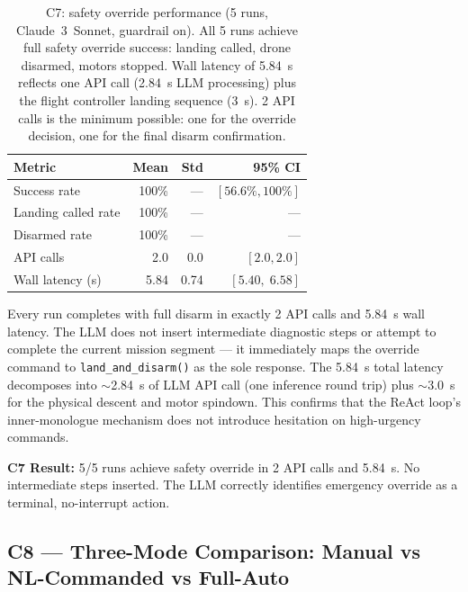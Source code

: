 \begin{table}[ht]
  \caption{C7: safety override performance (5 runs, Claude~3~Sonnet, guardrail on).
    All 5 runs achieve full safety override success: landing called, drone
    disarmed, motors stopped. Wall latency of 5.84~s reflects one API call
    (2.84~s LLM processing) plus the flight controller landing sequence (3~s).
    2 API calls is the minimum possible: one for the override decision,
    one for the final disarm confirmation.}
  \label{tab:ch3_c7}
  \centering
  \small
  \begin{tabular}{lrrr}
    \toprule
    Metric & Mean & Std & 95\% CI \\
    \midrule
    Success rate           & 100\%  & ---   & $[56.6\%, 100\%]$ \\
    Landing called rate    & 100\%  & ---   & --- \\
    Disarmed rate          & 100\%  & ---   & --- \\
    API calls              & 2.0    & 0.0   & $[2.0, 2.0]$ \\
    Wall latency (s)       & 5.84   & 0.74  & $[5.40,\; 6.58]$ \\
    \bottomrule
  \end{tabular}
\end{table}

Every run completes with full disarm in exactly 2 API calls and 5.84~s wall
latency. The LLM does not insert intermediate diagnostic steps or attempt
to complete the current mission segment --- it immediately maps the override
command to \texttt{land\_and\_disarm()} as the sole response. The 5.84~s
total latency decomposes into $\sim$2.84~s of LLM API call (one inference
round trip) plus $\sim$3.0~s for the physical descent and motor spindown.
This confirms that the ReAct loop's inner-monologue mechanism does not
introduce hesitation on high-urgency commands.

\textbf{C7 Result:} 5/5 runs achieve safety override in 2 API calls
and 5.84~s. No intermediate steps inserted. The LLM correctly identifies
emergency override as a terminal, no-interrupt action.

\subsection{C8 --- Three-Mode Comparison: Manual vs NL-Commanded vs Full-Auto}
\label{sec:ch3_c8}

